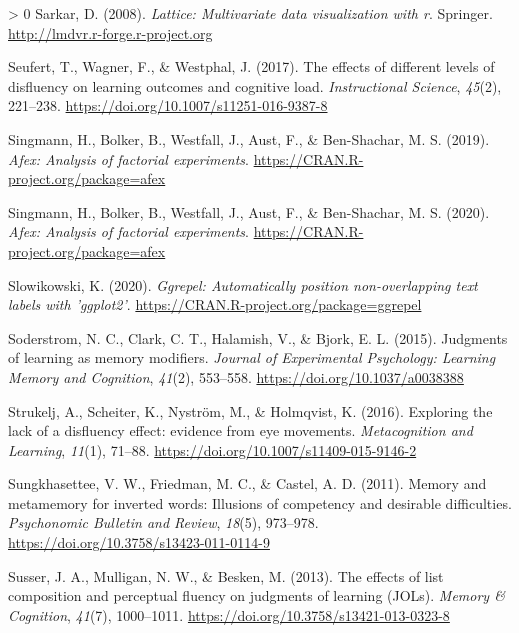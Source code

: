 \documentclass[
  english,
  jou]{apa7}
\newlength{\cslhangindent}
\newenvironment{CSLReferences}[3] %
 {%
  \setlength{\parindent}{0pt}
  \ifodd #1 \everypar{\setlength{\hangindent}{\cslhangindent}}\ignorespaces\fi
  \ifnum #2 > 0
  \setlength{\parskip}{#2\baselineskip}
  \fi
 }%
 {}
\begin{document}
\begin{CSLReferences}{1}{0}
\leavevmode\hypertarget{ref-R-lattice}{}%
Sarkar, D. (2008). \emph{Lattice: Multivariate data visualization with r}. Springer. \url{http://lmdvr.r-forge.r-project.org}

\leavevmode\hypertarget{ref-Seufert2017}{}%
Seufert, T., Wagner, F., \& Westphal, J. (2017). {The effects of different levels of disfluency on learning outcomes and cognitive load}. \emph{Instructional Science}, \emph{45}(2), 221--238. \url{https://doi.org/10.1007/s11251-016-9387-8}

\leavevmode\hypertarget{ref-R-afex}{}%
Singmann, H., Bolker, B., Westfall, J., Aust, F., \& Ben-Shachar, M. S. (2019). \emph{Afex: Analysis of factorial experiments}. \url{https://CRAN.R-project.org/package=afex}

\leavevmode\hypertarget{ref-Singmann2020}{}%
Singmann, H., Bolker, B., Westfall, J., Aust, F., \& Ben-Shachar, M. S. (2020). \emph{Afex: Analysis of factorial experiments}. \url{https://CRAN.R-project.org/package=afex}

\leavevmode\hypertarget{ref-R-ggrepel}{}%
Slowikowski, K. (2020). \emph{Ggrepel: Automatically position non-overlapping text labels with 'ggplot2'}. \url{https://CRAN.R-project.org/package=ggrepel}

\leavevmode\hypertarget{ref-Soderstrom2015}{}%
Soderstrom, N. C., Clark, C. T., Halamish, V., \& Bjork, E. L. (2015). {Judgments of learning as memory modifiers}. \emph{Journal of Experimental Psychology: Learning Memory and Cognition}, \emph{41}(2), 553--558. \url{https://doi.org/10.1037/a0038388}

\leavevmode\hypertarget{ref-Strukelj2016}{}%
Strukelj, A., Scheiter, K., Nyström, M., \& Holmqvist, K. (2016). {Exploring the lack of a disfluency effect: evidence from eye movements}. \emph{Metacognition and Learning}, \emph{11}(1), 71--88. \url{https://doi.org/10.1007/s11409-015-9146-2}

\leavevmode\hypertarget{ref-Sungkhasettee2011}{}%
Sungkhasettee, V. W., Friedman, M. C., \& Castel, A. D. (2011). {Memory and metamemory for inverted words: Illusions of competency and desirable difficulties}. \emph{Psychonomic Bulletin and Review}, \emph{18}(5), 973--978. \url{https://doi.org/10.3758/s13423-011-0114-9}

\leavevmode\hypertarget{ref-Susser2013}{}%
Susser, J. A., Mulligan, N. W., \& Besken, M. (2013). {The effects of list composition and perceptual fluency on judgments of learning (JOLs)}. \emph{Memory {\&} Cognition}, \emph{41}(7), 1000--1011. \url{https://doi.org/10.3758/s13421-013-0323-8}


\end{CSLReferences}
\end{document}
